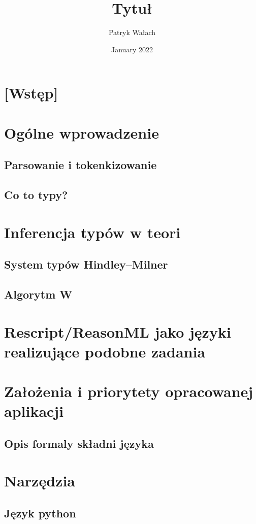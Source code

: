 \documentclass{article}
\title{Tytuł}
\author{Patryk Wałach}
\date{January 2022}
\begin{document}
\maketitle

\section{[Wstęp]}

\section{Ogólne wprowadzenie}
    \subsection{Parsowanie i tokenkizowanie}
    \subsection{Co to typy?}
\section{Inferencja typów w teori}
    \subsection{System typów Hindley–Milner}
    \subsection{Algorytm W}
\section{Rescript/ReasonML jako języki realizujące podobne zadania}
\section{Założenia i priorytety opracowanej aplikacji}
    \subsection{Opis formaly składni języka}
\section{Narzędzia}
    \subsection{Język python}
\end{document}
